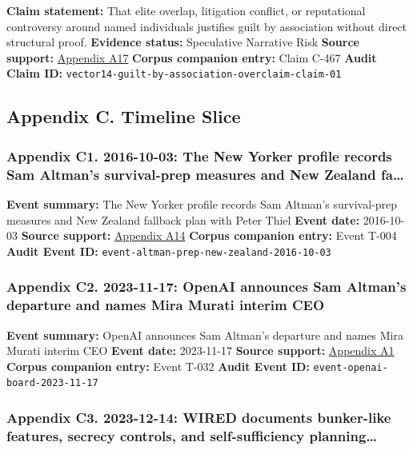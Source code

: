 \documentclass[
  american,
  11pt,
  letterpaper,
]{article}
\begin{document}
\textbf{Claim statement:} That elite overlap, litigation conflict, or
reputational controversy around named individuals justifies guilt by
association without direct structural proof. \textbf{Evidence status:}
Speculative Narrative Risk \textbf{Source support:}
\hyperref[appendix-a17-musk-v-altman-4-24-cv-04722]{Appendix A17}
\textbf{Corpus companion entry:} Claim C-467 \textbf{Audit Claim ID:}
\texttt{vector14-guilt-by-association-overclaim-claim-01}

\subsection{Appendix C. Timeline
Slice}\label{appendix-c.-timeline-slice}

\subsubsection{Appendix C1. 2016-10-03: The New Yorker profile records
Sam Altman's survival-prep measures and New Zealand
fa\ldots{}}\label{appendix-c1-2016-10-03-the-new-yorker-profile-records-sam-altman-s-survival-prep-measures-and-new-zealand-fallback-plan-with-peter-thiel}

\textbf{Event summary:} The New Yorker profile records Sam Altman's
survival-prep measures and New Zealand fallback plan with Peter Thiel
\textbf{Event date:} 2016-10-03 \textbf{Source support:}
\hyperref[appendix-a14-sam-altman-s-manifest-destiny]{Appendix A14}
\textbf{Corpus companion entry:} Event T-004 \textbf{Audit Event ID:}
\texttt{event-altman-prep-new-zealand-2016-10-03}

\subsubsection{Appendix C2. 2023-11-17: OpenAI announces Sam Altman's
departure and names Mira Murati interim
CEO}\label{appendix-c2-2023-11-17-openai-announces-sam-altmans-departure-and-names-mira-murati-interim-ceo}

\textbf{Event summary:} OpenAI announces Sam Altman's departure and
names Mira Murati interim CEO \textbf{Event date:} 2023-11-17
\textbf{Source support:}
\hyperref[appendix-a1-openai-announces-leadership-transition]{Appendix
A1} \textbf{Corpus companion entry:} Event T-032 \textbf{Audit Event
ID:} \texttt{event-openai-board-2023-11-17}

\subsubsection{Appendix C3. 2023-12-14: WIRED documents bunker-like
features, secrecy controls, and self-sufficiency
planning\ldots{}}\label{appendix-c3-2023-12-14-wired-documents-bunker-like-features-secrecy-controls-and-self-sufficiency-planning-at-zuckerberg-s-kauai-compound}
\end{document}
